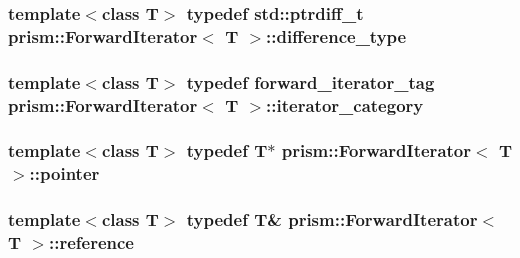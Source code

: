 \subsubsection[{\texorpdfstring{difference\+\_\+type}{difference_type}}]{\setlength{\rightskip}{0pt plus 5cm}template$<$class T$>$ typedef std\+::ptrdiff\+\_\+t {\bf prism\+::\+Forward\+Iterator}$<$ T $>$\+::{\bf difference\+\_\+type}}\hypertarget{classprism_1_1_forward_iterator_a8c90486e85c02351c2e957ba3247ab10}{}\label{classprism_1_1_forward_iterator_a8c90486e85c02351c2e957ba3247ab10}
\subsubsection[{\texorpdfstring{iterator\+\_\+category}{iterator_category}}]{\setlength{\rightskip}{0pt plus 5cm}template$<$class T$>$ typedef {\bf forward\+\_\+iterator\+\_\+tag} {\bf prism\+::\+Forward\+Iterator}$<$ T $>$\+::{\bf iterator\+\_\+category}}\hypertarget{classprism_1_1_forward_iterator_a12bfb01d6fffd1595296c3625ee1f825}{}\label{classprism_1_1_forward_iterator_a12bfb01d6fffd1595296c3625ee1f825}
\subsubsection[{\texorpdfstring{pointer}{pointer}}]{\setlength{\rightskip}{0pt plus 5cm}template$<$class T$>$ typedef T$\ast$ {\bf prism\+::\+Forward\+Iterator}$<$ T $>$\+::{\bf pointer}}\hypertarget{classprism_1_1_forward_iterator_af50dd6e13f3cea3ee3b2332e48996502}{}\label{classprism_1_1_forward_iterator_af50dd6e13f3cea3ee3b2332e48996502}
\subsubsection[{\texorpdfstring{reference}{reference}}]{\setlength{\rightskip}{0pt plus 5cm}template$<$class T$>$ typedef T\& {\bf prism\+::\+Forward\+Iterator}$<$ T $>$\+::{\bf reference}}\hypertarget{classprism_1_1_forward_iterator_a4f7bff2c238f447c1537c74fe09f8935}{}\label{classprism_1_1_forward_iterator_a4f7bff2c238f447c1537c74fe09f8935}
